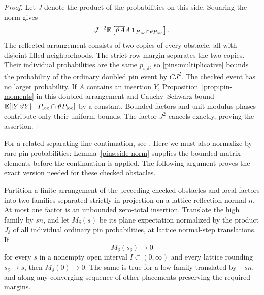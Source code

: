 \begin{proof}
Let $J$ denote the product of the probabilities on this side.  Squaring
the norm gives
\[
 J^{-2}\mathbb E\left[\overline{\vartheta A}A\,
    \mathbf 1_{P_{\mathrm{loc}}\cap\vartheta P_{\mathrm{loc}}}\right].
\]
The reflected arrangement consists of two copies of every obstacle,
all with disjoint filled neighborhoods.  The strict row margin
separates the two copies.  Their individual probabilities are the
same $p_{i,\delta}$, so \eqref{pins:multiplicative} bounds the
probability of the ordinary doubled pin event by $CJ^2$.
The checked event has no larger probability.  If $A$ contains an
insertion $Y$, Proposition~\ref{prop:pin-moments} in this doubled
arrangement and Cauchy--Schwarz bound
$\mathbb E[|Y\,\vartheta Y|\mid P_{\mathrm{loc}}\cap
\vartheta P_{\mathrm{loc}}]$ by a constant.  Bounded factors and
unit-modulus phases contribute only their uniform bounds.  The
factor $J^2$ cancels exactly, proving the assertion.
\end{proof}

For a related separating-line continuation, see
\cite[Section~7.1, Lemma~7.4]{DCKLM2026}.
Here we must also normalize by rare pin probabilities:
Lemma~\ref{pins:side-norm} supplies the bounded matrix elements before
the continuation is applied.  The following argument proves the exact
version needed for these checked obstacles.

\begin{lemma}\label{lem:analytic-translation}
Partition a finite arrangement of the preceding checked obstacles and
local factors into two families separated strictly in projection on a
lattice reflection normal $n$.  At most one factor is an unbounded
zero-total insertion.  Translate the high family by $sn$, and let
$M_\delta(s)$ be its plane expectation normalized by the product
$J_\delta$ of all individual ordinary pin probabilities, at lattice
normal-step translations.  If
\[
 M_\delta(s_\delta)\longrightarrow0
\]
for every $s$ in a nonempty open interval $I\subset(0,\infty)$ and
every lattice rounding $s_\delta\to s$, then $M_\delta(0)\to0$.
The same is true for a low family translated by $-sn$, and along any
converging sequence of other placements preserving the required margins.
\end{lemma}

